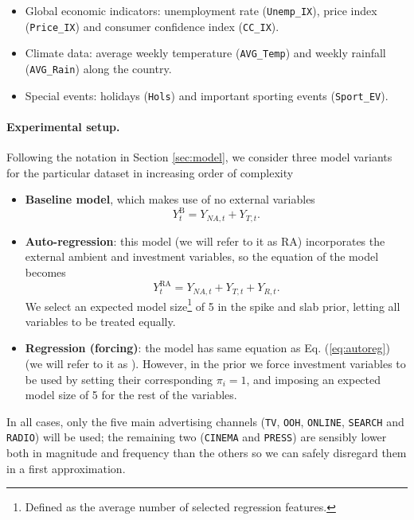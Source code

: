 \begin{itemize}
\item Global economic indicators: unemployment rate (\texttt{Unemp\_IX}), price index (\texttt{Price\_IX}) and consumer confidence index (\texttt{CC\_IX}).
\item Climate data: average weekly temperature (\texttt{AVG\_Temp}) and weekly rainfall (\texttt{AVG\_Rain}) along the country.
\item Special events: holidays (\texttt{Hols}) and important sporting events (\texttt{Sport\_EV}).
\end{itemize}

\paragraph{Experimental setup.}

Following the notation in Section \ref{sec:model}, we consider three model variants for the particular dataset in increasing order of complexity


\begin{itemize}
\item \textbf{Baseline model}, which makes use of no external variables $$Y^{\text{B}}_t = Y_{NA,t} + Y_{T, t}.$$
\item \textbf{Auto-regression}: this model (we will refer to it as RA) incorporates the external ambient and investment variables, so the equation of the model becomes 
\begin{equation}\label{eq:autoreg}
Y_t^{\text{RA}} = Y_{NA,t} + Y_{T, t} + Y_{R,t}.
\end{equation}
We select an expected model size\footnote{Defined as the average number of selected regression features.} of 5 in the spike and slab prior, letting all variables to be treated equally.
\item \textbf{Regression (forcing)}: the model has same equation as Eq. (\ref{eq:autoreg}) (we will refer to it as ).
However, in the prior we force investment variables to be used by setting their corresponding $\pi_i = 1$, and imposing an expected model size of 5 for the rest of the variables.
\end{itemize}
In all cases, only the five main advertising channels (\texttt{TV}, \texttt{OOH}, \texttt{ONLINE}, \texttt{SEARCH} and \texttt{RADIO}) will be used; the remaining two (\texttt{CINEMA} and \texttt{PRESS}) are sensibly lower both in magnitude and frequency than the others so we can safely disregard them in a first approximation. 


